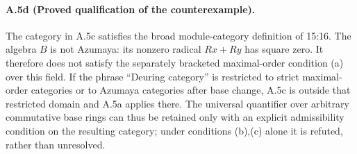 \paragraph{A.5d (Proved qualification of the counterexample).}
The category in A.5c satisfies the broad module-category definition
of 15:16. The algebra $B$ is not Azumaya: its nonzero radical
$Rx+Ry$ has square zero. It therefore does not satisfy the separately
bracketed maximal-order condition (a) over this field. If the phrase
``Deuring category'' is restricted to strict maximal-order categories
or to Azumaya categories after base change, A.5c is outside that
restricted domain and A.5a applies there. The universal quantifier
over arbitrary commutative base rings can thus be retained only
with an explicit admissibility condition on the resulting category;
under conditions (b),(c) alone it is refuted, rather than unresolved.
